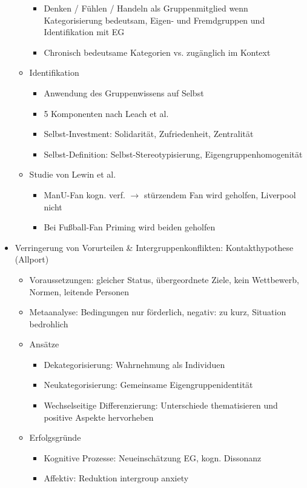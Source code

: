 \documentclass[11pt, paper=a4, twocolumn]{scrartcl}
\begin{document}
\begin{itemize}
\begin{itemize}
\begin{itemize}
							\item Denken / Fühlen / Handeln als Gruppenmitglied wenn Kategorisierung bedeutsam, Eigen- und 
								Fremdgruppen und Identifikation mit EG
							\item Chronisch bedeutsame Kategorien vs. zugänglich im Kontext
						\end{itemize}
					\item Identifikation
						\begin{itemize}
							\item Anwendung des Gruppenwissens auf Selbst
							\item 5 Komponenten nach Leach et al.
							\item Selbst-Investment: Solidarität, Zufriedenheit, Zentralität
							\item Selbst-Definition: Selbst-Stereotypisierung, Eigengruppenhomogenität
						\end{itemize}
					\item Studie von Lewin et al.
						\begin{itemize}
							\item ManU-Fan kogn. verf. $\rightarrow$ stürzendem Fan wird geholfen, Liverpool nicht
							\item Bei Fußball-Fan Priming wird beiden geholfen
						\end{itemize}

				\end{itemize}
			\item Verringerung von Vorurteilen \& Intergruppenkonflikten: Kontakthypothese (Allport)
				\begin{itemize}
					\item Voraussetzungen: gleicher Status, übergeordnete Ziele, kein Wettbewerb, Normen, leitende Personen
					\item Metaanalyse: Bedingungen nur förderlich, negativ: zu kurz, Situation bedrohlich
					\item Ansätze
						\begin{itemize}
							\item Dekategorisierung: Wahrnehmung als Individuen
							\item Neukategorisierung: Gemeinsame Eigengruppenidentität
							\item Wechselseitige Differenzierung: Unterschiede thematisieren und  positive Aspekte 
								hervorheben
						\end{itemize}
					\item Erfolgsgründe
						\begin{itemize}
							\item Kognitive Prozesse: Neueinschätzung EG, kogn. Dissonanz
							\item Affektiv: Reduktion intergroup anxiety
						\end{itemize}
				\end{itemize}
		\end{itemize}
\end{document}
